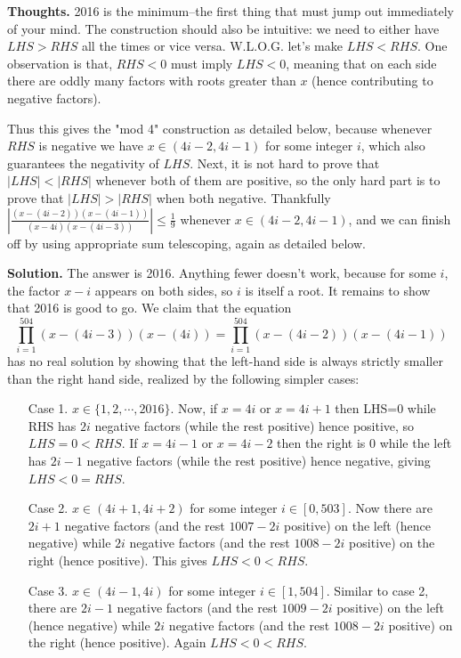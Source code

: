 \documentclass[11pt,a4paper]{article}
\begin{document}
\begin{itemize}
\textbf{Thoughts.} 2016 is the minimum--the first thing that must jump out immediately of your mind. 
The construction should also be intuitive: we need to either have $LHS>RHS$ all the times or vice versa. 
W.L.O.G. let's make $LHS<RHS$. One observation is that, $RHS<0$ must imply $LHS<0$, meaning that on each side there are oddly many factors with roots greater than $x$ (hence contributing to negative factors). 

Thus this gives the "mod 4" construction as detailed below, because whenever $RHS$ is negative we have $x\in (4i-2, 4i-1)$ for some integer $i$, which also guarantees the negativity of $LHS$. 
Next, it is not hard to prove that $|LHS|<|RHS|$ whenever both of them are positive, 
so the only hard part is to prove that $|LHS|>|RHS|$ when both negative. 
Thankfully $|\frac{(x-(4i-2))(x-(4i-1))}{(x-4i)(x-(4i-3))}|\le \frac 19$ whenever $x\in (4i-2, 4i-1)$, and we can finish off by using appropriate sum telescoping, again as detailed below. 

\textbf{Solution.} The answer is 2016. 
Anything fewer doesn't work, because for some $i$, the factor $x-i$ appears on both sides, 
so $i$ is itself a root. It remains to show that 2016 is good to go. 
We claim that the equation 
$$\displaystyle\prod_{i=1}^{504} (x-(4i-3))(x-(4i))=\displaystyle\prod_{i=1}^{504} (x-(4i-2))(x-(4i-1))$$ 
has no real solution by showing that the left-hand side is always strictly smaller than the right hand side, realized by the following simpler cases: 
\begin{itemize}
\item [Case 1.] 
$x\in\{1,2,\cdots ,2016\}$. 
Now, if $x=4i$ or $x=4i+1$ then LHS=0 while RHS has $2i$ negative factors (while the rest positive) hence positive, 
so $LHS=0<RHS$. 
If $x=4i-1$ or $x=4i-2$ then the right is 0 while the left has $2i-1$ negative factors (while the rest positive) hence negative, 
giving $LHS<0=RHS$. 

\item [Case 2.] $x\in (4i+1, 4i+2)$ for some integer $i\in [0, 503]$. 
Now there are $2i+1$ negative factors (and the rest $1007-2i$ positive) on the left (hence negative) while $2i$ negative factors (and the rest $1008-2i$ positive) on the right (hence positive). This gives $LHS<0<RHS$.

\item [Case 3.] $x\in (4i-1, 4i)$ for some integer $i\in [1, 504]$. 
Similar to case 2, there are $2i-1$ negative factors (and the rest $1009-2i$ positive) on the left (hence negative) while $2i$ negative factors (and the rest $1008-2i$ positive) on the right (hence positive). 
Again $LHS<0<RHS$. 


\end{itemize}
\end{itemize}
\end{document}
